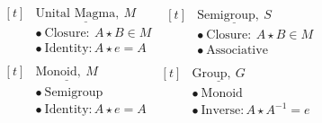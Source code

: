 \documentclass{article}
\begin{document}
\newpage

\(\begin{aligned}[t]
    & \underline{\text{Unital Magma},\ M}\\
    & \bullet\ \text{Closure}:\ A \star B \in M\\
    & \bullet\ \text{Identity}: A \star e = A\\
\end{aligned}\)
\hspace{15pt}
\(\begin{aligned}[t]
    & \underline{\text{Semigroup},\ S}\\
    & \bullet\ \text{Closure}:\ A \star B \in M\\
    & \bullet\ \text{Associative}\\
\end{aligned}\)
\hspace{15pt}
\(\begin{aligned}[t]
    & \underline{\text{Monoid},\ M}\\
    & \bullet\ \text{Semigroup}\\
    & \bullet\ \text{Identity}: A \star e = A\\
\end{aligned}\)
\hspace{15pt}
\(\begin{aligned}[t]
    & \underline{\text{Group},\ G}\\
    & \bullet\ \text{Monoid} \\
    & \bullet\ \text{Inverse}: A \star A^{-1} = e\\
\end{aligned}\)
\end{document}
